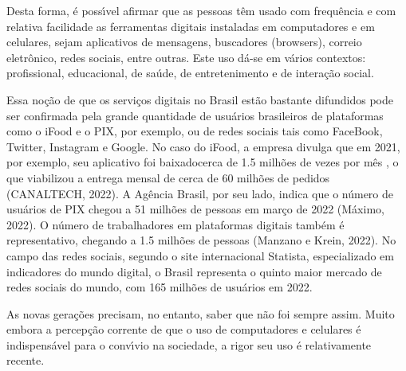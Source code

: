 \documentclass[
12pt,		%
openright,	%
twoside,  %
a4paper,			%
chapter=TITLE,		%
english,			%
french,				%
spanish,			%
brazil				%
]{USPSC-classe/USPSC}
\begin{document}
Desta forma, \'e poss\'{\i}vel afirmar que as pessoas t\^em usado com frequ\^encia e com relativa facilidade as ferramentas digitais instaladas em computadores e em celulares, sejam aplicativos de mensagens, buscadores (browsers), correio eletr\^onico, redes sociais, entre outras. Este uso d\'a-se em v\'arios contextos: profissional, educacional, de sa\'ude,  de entretenimento e de intera\c{c}\~ao social.

















Essa no\c{c}\~ao de que os servi\c{c}os digitais no Brasil est\~ao bastante difundidos pode ser confirmada pela grande quantidade de usu\'arios brasileiros de plataformas como o iFood e o PIX, por exemplo, ou de redes sociais tais como FaceBook, Twitter, Instagram e Google. No caso do iFood, a empresa divulga que em 2021, por exemplo, seu aplicativo foi \textquotedbl baixado\textquotedbl  cerca de 1.5 milh\~oes de vezes por m\^es , o que viabilizou a entrega mensal de cerca de 60 milh\~oes de pedidos  (CANALTECH, 2022). A Ag\^encia Brasil, por seu lado, indica que o n\'umero de usu\'arios de PIX chegou a 51 milh\~oes de pessoas em mar\c{c}o de 2022  (M\'aximo, 2022). O n\'umero de trabalhadores em plataformas digitais tamb\'em \'e representativo, chegando a 1.5 milh\~oes de pessoas  (Manzano e Krein, 2022). No campo das redes sociais, segundo o site internacional Statista, especializado em indicadores do mundo digital, o Brasil representa o quinto maior mercado de redes sociais do mundo, com 165 milh\~oes de usu\'arios em 2022.

















As novas gera\c{c}\~oes precisam, no entanto, saber que n\~ao foi sempre assim. Muito embora a percep\c{c}\~ao corrente de que o uso de computadores e celulares \'e indispens\'avel para o conv\'{\i}vio na sociedade, a rigor seu uso \'e relativamente recente.
\end{document}
